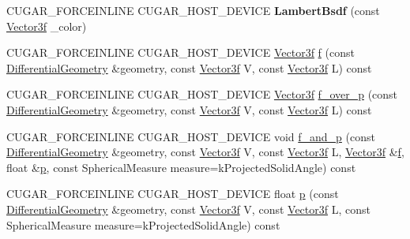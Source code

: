 \begin{DoxyCompactItemize}
\item 
\mbox{\label{structcugar_1_1_lambert_bsdf_a3fe72daa2edc78377d63a2e0f368b58a}} 
C\+U\+G\+A\+R\+\_\+\+F\+O\+R\+C\+E\+I\+N\+L\+I\+NE C\+U\+G\+A\+R\+\_\+\+H\+O\+S\+T\+\_\+\+D\+E\+V\+I\+CE {\bfseries Lambert\+Bsdf} (const \hyperlink{structcugar_1_1_vector}{Vector3f} \+\_\+color)
\item 
C\+U\+G\+A\+R\+\_\+\+F\+O\+R\+C\+E\+I\+N\+L\+I\+NE C\+U\+G\+A\+R\+\_\+\+H\+O\+S\+T\+\_\+\+D\+E\+V\+I\+CE \hyperlink{structcugar_1_1_vector}{Vector3f} \hyperlink{structcugar_1_1_lambert_bsdf_a42aa3e5967a4dfbf2ba3b1793ebfdf9e}{f} (const \hyperlink{structcugar_1_1_differential_geometry}{Differential\+Geometry} \&geometry, const \hyperlink{structcugar_1_1_vector}{Vector3f} V, const \hyperlink{structcugar_1_1_vector}{Vector3f} L) const
\item 
C\+U\+G\+A\+R\+\_\+\+F\+O\+R\+C\+E\+I\+N\+L\+I\+NE C\+U\+G\+A\+R\+\_\+\+H\+O\+S\+T\+\_\+\+D\+E\+V\+I\+CE \hyperlink{structcugar_1_1_vector}{Vector3f} \hyperlink{structcugar_1_1_lambert_bsdf_a5e22f75a67105055c6b0aaf3103c17ef}{f\+\_\+over\+\_\+p} (const \hyperlink{structcugar_1_1_differential_geometry}{Differential\+Geometry} \&geometry, const \hyperlink{structcugar_1_1_vector}{Vector3f} V, const \hyperlink{structcugar_1_1_vector}{Vector3f} L) const
\item 
C\+U\+G\+A\+R\+\_\+\+F\+O\+R\+C\+E\+I\+N\+L\+I\+NE C\+U\+G\+A\+R\+\_\+\+H\+O\+S\+T\+\_\+\+D\+E\+V\+I\+CE void \hyperlink{structcugar_1_1_lambert_bsdf_a0d594961bb1867eef9e20ef2fd7f260f}{f\+\_\+and\+\_\+p} (const \hyperlink{structcugar_1_1_differential_geometry}{Differential\+Geometry} \&geometry, const \hyperlink{structcugar_1_1_vector}{Vector3f} V, const \hyperlink{structcugar_1_1_vector}{Vector3f} L, \hyperlink{structcugar_1_1_vector}{Vector3f} \&\hyperlink{structcugar_1_1_lambert_bsdf_a42aa3e5967a4dfbf2ba3b1793ebfdf9e}{f}, float \&\hyperlink{structcugar_1_1_lambert_bsdf_a954a19a6d6fd8d13bc35c65135e15a0a}{p}, const Spherical\+Measure measure=k\+Projected\+Solid\+Angle) const
\item 
C\+U\+G\+A\+R\+\_\+\+F\+O\+R\+C\+E\+I\+N\+L\+I\+NE C\+U\+G\+A\+R\+\_\+\+H\+O\+S\+T\+\_\+\+D\+E\+V\+I\+CE float \hyperlink{structcugar_1_1_lambert_bsdf_a954a19a6d6fd8d13bc35c65135e15a0a}{p} (const \hyperlink{structcugar_1_1_differential_geometry}{Differential\+Geometry} \&geometry, const \hyperlink{structcugar_1_1_vector}{Vector3f} V, const \hyperlink{structcugar_1_1_vector}{Vector3f} L, const Spherical\+Measure measure=k\+Projected\+Solid\+Angle) const

\end{DoxyCompactItemize}
